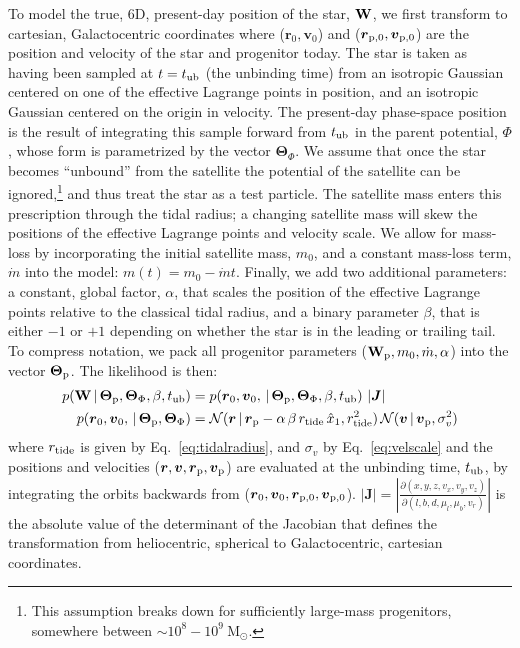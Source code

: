 \documentclass[letterpaper,12pt,preprint]{aastex}
\newcommand{\given}{\,|\,}
\newcommand{\msun}{\mathrm{M}_\odot}
\newcommand{\W}{{\bf W}}
\newcommand{\J}{{\boldsymbol J}}
\newcommand{\rtide}{r_{\rm tide}}
\newcommand{\bs}{\boldsymbol}
\newcommand{\sat}{{\rm p}}
\newcommand{\tub}{t_{\rm ub}}
\newcommand{\tailbit}{\beta}
\newcommand{\Loffset}{\alpha}
\begin{document}
To model the true, 6D, present-day position of the star, $\W$, we first transform to cartesian, Galactocentric coordinates where ($\bs{r}_0,\bs{v}_0$) and ($\bs{r}_{\sat,0},\bs{v}_{\sat,0}$) are the position and velocity of the star and progenitor today. The star is taken as having been sampled at $t=\tub$ (the unbinding time) from an isotropic Gaussian centered on one of the effective Lagrange points in position, and an isotropic Gaussian centered on the origin in velocity. The present-day phase-space position is the result of integrating this sample forward from $\tub$ in the parent potential, $\Phi$, whose form is parametrized by the vector $\bs{\Theta}_\Phi$. We assume that once the star becomes ``unbound'' from the satellite the potential of the satellite can be ignored,\footnote{This assumption breaks down for sufficiently large-mass progenitors, somewhere between $\sim10^8-10^9~\msun$.} and thus treat the star as a test particle. The satellite mass enters this prescription through the tidal radius; a changing satellite mass will skew the positions of the effective Lagrange points and velocity scale. We allow for mass-loss by incorporating the initial satellite mass, $m_0$, and a constant mass-loss term, $\dot{m}$ into the model: $m(t) = m_0 - \dot{m}t$. Finally, we add two additional parameters: a constant, global factor, $\Loffset$, that scales the position of the effective Lagrange points relative to the classical tidal radius, and a binary parameter $\tailbit$, that is either $-1$ or $+1$ depending on whether the star is in the leading or trailing tail. To compress notation, we pack all progenitor parameters ($\W_\sat, m_0, \dot{m}, \Loffset$) into the vector $\bs{\Theta}_\sat$. The likelihood is then: %
\begin{align}
	p(\W \given \bs{\Theta}_\sat, \bs{\Theta}_\Phi, \tailbit, \tub) &= p(\bs{r}_0,\bs{v}_0, \given \bs{\Theta}_\sat, \bs{\Theta}_\Phi, \tailbit, \tub)\,\left\vert\J\right\vert\label{eq:starlike}\\
	p(\bs{r}_0,\bs{v}_0, \given \bs{\Theta}_\sat, \bs{\Theta}_\Phi) &= \mathcal{N}(\bs{r} \given \bs{r}_\sat - \Loffset\,\tailbit\,\rtide\,\hat{x}_1, \rtide^2)\,\mathcal{N}(\bs{v} \given \bs{v}_\sat, \sigma^2_v)
\end{align}
where $\rtide$ is given by Eq.~\ref{eq:tidalradius}, and $\sigma_v$ by Eq.~\ref{eq:velscale} and the positions and velocities ($\bs{r},\bs{v}, \bs{r}_{\sat},\bs{v}_{\sat}$) are evaluated at the unbinding time, $\tub$, by integrating the orbits backwards from ($\bs{r}_0,\bs{v}_0, \bs{r}_{\sat,0},\bs{v}_{\sat,0}$). $\left\vert\J\right\vert = \left\vert\frac{\partial(x,y,z,v_x,v_y,v_z)}{\partial(l,b,d,\mu_l,\mu_b,v_r)}\right\vert$ is the absolute value of the determinant of the Jacobian that defines the transformation from heliocentric, spherical to Galactocentric, cartesian coordinates. 
\end{document}
